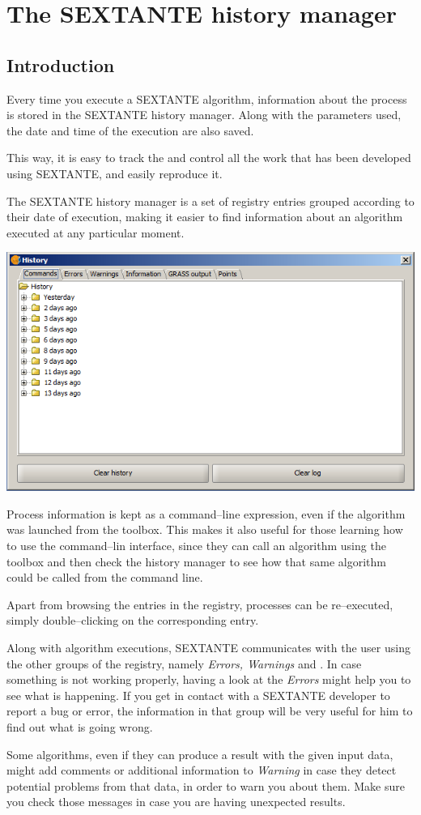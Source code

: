 \chapter{The SEXTANTE history manager}

\section {Introduction}

Every time you execute a SEXTANTE algorithm, information about the process is stored in the SEXTANTE history manager. Along with the parameters used, the date and time of the execution are also saved.

This way, it is easy to track the and control all the work that has been developed using SEXTANTE, and easily reproduce it.

The SEXTANTE history manager is a set of registry entries grouped according to their date of execution, making it easier to find information about an algorithm executed at any particular moment.

\begin{center}
\includegraphics[width=.4\columnwidth]{history.png}
\end{center}

Process information is kept as a command--line expression, even if the algorithm was launched from the toolbox. This makes it also useful for those learning how to use the command--lin interface, since they can call an algorithm using the toolbox and then check the history manager to see how that same algorithm could be called from the command line.

Apart from browsing the entries in the registry, processes can be re--executed, simply double--clicking on the corresponding entry.

Along with algorithm executions, SEXTANTE communicates with the user using the other groups of the registry, namely \emph{Errors, Warnings} and . In case something is not working properly, having a look at the \emph{Errors} might help you to see what is happening. If you get in contact with a SEXTANTE developer to report a bug or error, the information in that group will be very useful for him to find out what is going wrong.

Some algorithms, even if they can produce a result with the given input data, might add comments or additional information to \emph{Warning} in case they detect potential problems from that data, in order to warn you about them. Make sure you check those messages in case you are having unexpected results.